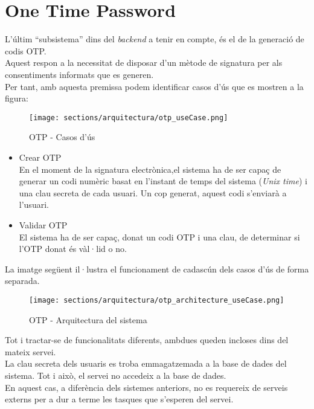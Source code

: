 \section{One Time Password}
\label{arquitectura:otp}
L'últim ``subsistema'' dins del \textit{backend} a tenir en compte, és el de la generació de codis OTP.\\
Aquest respon a la necessitat de disposar d'un mètode de signatura per als consentiments informats que es generen.\\
\newline Per tant, amb aquesta premissa podem identificar casos d'ús que es mostren a la figura:
\begin{figure}[h]
\texttt{[image: sections/arquitectura/otp\_useCase.png]}
\centering
\caption{OTP - Casos d'ús}
\label{fig:otp_workflow}
\end{figure}
\begin{itemize}
    \item Crear OTP\\
    En el moment de la signatura electrònica,el sistema ha de ser capaç de generar un codi numèric basat en l'instant de temps del sistema (\textit{Unix time}) i una clau secreta de cada usuari.
    Un cop generat, aquest codi s'enviarà a l'usuari.
    \item Validar OTP\\
    El sistema ha de ser capaç, donat un codi OTP i una clau, de determinar si l'OTP donat és vàl·lid o no.
\end{itemize}
La imatge següent il·lustra el funcionament de cadascún dels casos d'ús de forma separada.
\begin{figure}[h]
\texttt{[image: sections/arquitectura/otp\_architecture\_useCase.png]}
\centering
\caption{OTP - Arquitectura del sistema}
\label{fig:otp_workflow}
\end{figure}
\newline Tot i tractar-se de funcionalitats diferents, ambdues queden incloses dins del mateix servei.\\
\newline La clau secreta dels usuaris es troba emmagatzemada a la base de dades del sistema. Tot i això, el servei no accedeix a la base de dades.\\
En aquest cas, a diferència dels sistemes anteriors, no es requereix de serveis externs per a dur a terme les tasques que s'esperen del servei.

